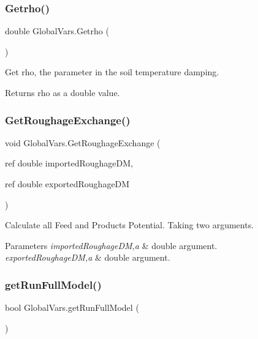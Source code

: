 \subsubsection{\texorpdfstring{Getrho()}{Getrho()}}
{\footnotesize\ttfamily double Global\+Vars.\+Getrho (\begin{DoxyParamCaption}{ }\end{DoxyParamCaption})\hspace{0.3cm}{\ttfamily [inline]}}



Get rho, the parameter in the soil temperature damping. 

\begin{DoxyReturn}{Returns}
rho as a double value. 
\end{DoxyReturn}
\mbox{\label{class_global_vars_a9ae8f3fa07b378ec836fa8519659f07e}} 
\subsubsection{\texorpdfstring{GetRoughageExchange()}{GetRoughageExchange()}}
{\footnotesize\ttfamily void Global\+Vars.\+Get\+Roughage\+Exchange (\begin{DoxyParamCaption}\item[{ref double}]{imported\+Roughage\+DM,  }\item[{ref double}]{exported\+Roughage\+DM }\end{DoxyParamCaption})\hspace{0.3cm}{\ttfamily [inline]}}



Calculate all Feed and Products Potential. Taking two arguments. 


\begin{DoxyParams}{Parameters}
{\em imported\+Roughage\+DM,a} & double argument. \\
\hline
{\em exported\+Roughage\+DM,a} & double argument. \\
\hline
\end{DoxyParams}
\mbox{\label{class_global_vars_a62e98fc98cd491dedbd0e83db9584da2}} 
\subsubsection{\texorpdfstring{getRunFullModel()}{getRunFullModel()}}
{\footnotesize\ttfamily bool Global\+Vars.\+get\+Run\+Full\+Model (\begin{DoxyParamCaption}{ }\end{DoxyParamCaption})\hspace{0.3cm}{\ttfamily [inline]}}



